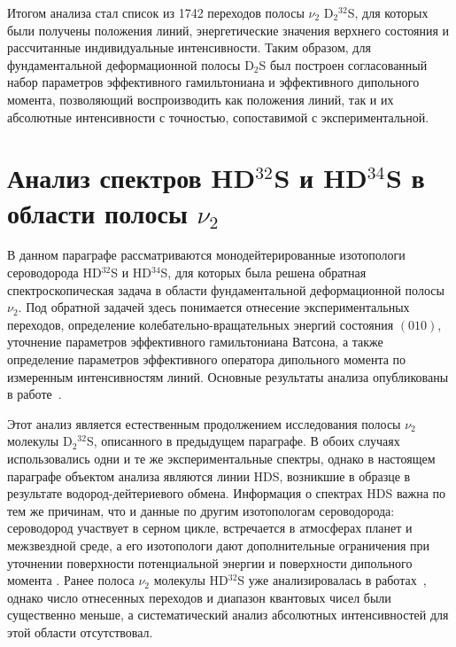 

Итогом анализа стал список из 1742 переходов полосы $\nu_2$ D$_2{}^{32}$S, для которых были получены
положения линий, энергетические значения верхнего состояния и рассчитанные индивидуальные
интенсивности. Таким образом, для фундаментальной деформационной полосы D$_2$S был построен
согласованный набор параметров эффективного гамильтониана и эффективного дипольного момента,
позволяющий воспроизводить как положения линий, так и их абсолютные интенсивности с точностью,
сопоставимой с экспериментальной.

\section{Анализ спектров HD$^{32}$S и HD$^{34}$S в области полосы $\nu_2$}\label{sec:ch3/HDS}\label{sec:ch2/HDS}

В данном параграфе рассматриваются монодейтерированные изотопологи сероводорода HD$^{32}$S и
HD$^{34}$S, для которых была решена обратная спектроскопическая задача в области фундаментальной
деформационной полосы $\nu_2$. Под обратной задачей здесь понимается отнесение экспериментальных
переходов, определение колебательно-вращательных энергий состояния $(010)$, уточнение параметров
эффективного гамильтониана Ватсона, а также определение параметров эффективного оператора дипольного
момента по измеренным интенсивностям линий. Основные результаты анализа опубликованы в
работе~\cite{hds_sydow2019}.

Этот анализ является естественным продолжением исследования полосы $\nu_2$ молекулы D$_2{}^{32}$S,
описанного в предыдущем параграфе. В обоих случаях использовались одни и те же экспериментальные
спектры, однако в настоящем параграфе объектом анализа являются линии HDS, возникшие в образце в
результате водород-дейтериевого обмена. Информация о спектрах HDS важна по тем же причинам, что и
данные по другим изотопологам сероводорода: сероводород участвует в серном цикле, встречается в
атмосферах планет и межзвездной среде, а его изотопологи дают дополнительные ограничения при уточнении
поверхности потенциальной энергии и поверхности дипольного момента
\cite{h2s_farquhar2000_science,h2s_farquhar2000_nature,h2s_thaddeus1972,h2s_vastel2003}. Ранее полоса
$\nu_2$ молекулы HD$^{32}$S уже анализировалась в работах~\cite{hds_camy1989,hds_ulenikov1995}, однако
число отнесенных переходов и диапазон квантовых чисел были существенно меньше, а систематический
анализ абсолютных интенсивностей для этой области отсутствовал.

